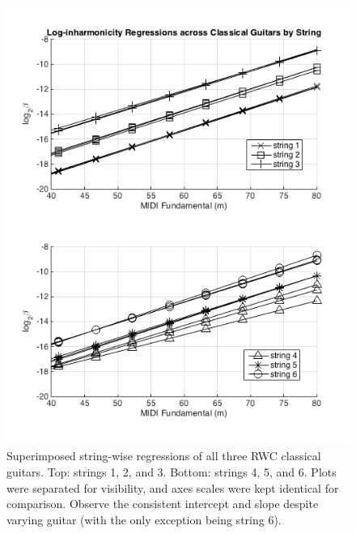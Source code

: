 \documentclass[12pt]{cmuthesis}
\begin{document}
\begin{figure}[!htbp] 
\label{fig:traj-compare-cg}
\centering
\includegraphics[scale=0.75]{traj-compare-cg}
\caption{Superimposed string-wise regressions of all three RWC classical guitars. Top: strings 1, 2, and 3. Bottom: strings 4, 5, and 6. Plots were separated for visibility, and axes scales were kept identical for comparison. Observe the consistent intercept and slope despite varying guitar (with the only exception being string 6).}
\end{figure}
\end{document}

